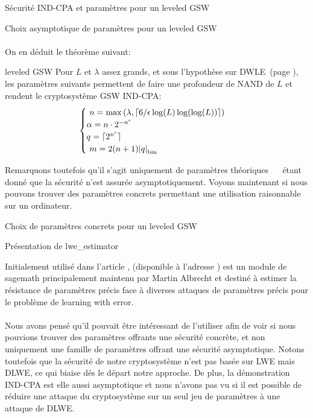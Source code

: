 \begin{section}{Sécurité IND-CPA et paramètres pour un leveled GSW}
\begin{subsection}{Choix asymptotique de paramètres pour un leveled GSW}
\paragraph{}
On en déduit le théorème suivant:
\begin{thm}{leveled GSW}
	Pour $L$ et $\lambda$ assez grands, et sous l'hypothèse sur DWLE~(page \pageref{hyp_dlwe}), les paramètres suivants permettent de faire une profondeur de NAND de $L$
et rendent le cryptosystème GSW IND-CPA:
\[ \begin{cases} 
	n = \max\left(\lambda, \lceil 6/\epsilon \log(L) \log(\log(L))
	\rceil\right)  \\
	\alpha  = n \cdot 2^{-n^\epsilon}  \\
	q = \lceil 2^{n^\epsilon} \rceil\\ 
	m = 2(n+1)\bnorm{q} \\  
	\end{cases}  \]
\end{thm}
Remarquons toutefois qu'il s'agit uniquement de paramètres \og théoriques \fg~ \ étant donné que la sécurité n'est
assurée asymptotiquement. Voyons maintenant si nous pouvons trouver des paramètres concrets permettant une utilisation 
raisonnable sur un ordinateur.

\end{subsection}

\begin{subsection}{Choix de paramètres concrets pour un leveled GSW}
\begin{subsubsection}{Présentation de lwe\_estimator}
\label{estimator}
	
Initialement utilisé dans l'article \cite{EPRINT:AlbPlaSco15},  (disponible à l'adresse
\cite{estimator}) est un module de sagemath principalement maintenu par Martin Albrecht et destiné à estimer la résistance
de paramètres précis face à diverses attaques de paramètres précis pour le problème de learning with error.

\paragraph{}
Nous avons pensé qu'il pouvait être intéressant de l'utiliser afin de voir si nous pouvions trouver des paramètres
offrants une sécurité concrète, et non uniquement une famille de paramètres offrant une sécurité asymptotique.
Notons toutefois que la sécurité de notre cryptosystème n'est pas basée sur LWE mais DLWE, ce qui biaise dés le départ 
notre approche. De plus, la démonstration IND-CPA est elle aussi asymptotique et nous n'avons pas vu si il est possible 
de réduire une attaque du cryptosystème sur un seul jeu de paramètres à une attaque de DLWE.


\end{subsubsection}
\end{subsection}
\end{section}
